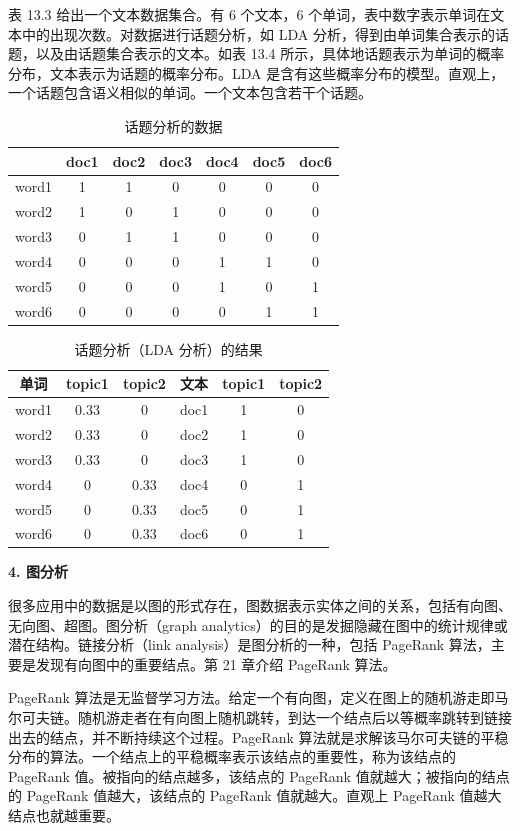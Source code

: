 \documentclass[UTF8,12pt,a4paper,fontset=fandol]{ctexart}
\begin{document}
表 13.3 给出一个文本数据集合。有 6 个文本，6 个单词，表中数字表示单词在文本中的出现次数。对数据进行话题分析，如 LDA 分析，得到由单词集合表示的话题，以及由话题集合表示的文本。如表 13.4 所示，具体地话题表示为单词的概率分布，文本表示为话题的概率分布。LDA 是含有这些概率分布的模型。直观上，一个话题包含语义相似的单词。一个文本包含若干个话题。

\begin{table}[htbp]
\centering
\caption{话题分析的数据}
\begin{tabular}{c|cccccc}
\toprule
 & doc1 & doc2 & doc3 & doc4 & doc5 & doc6\\
\midrule
word1 & 1 & 1 & 0 & 0 & 0 & 0\\
word2 & 1 & 0 & 1 & 0 & 0 & 0\\
word3 & 0 & 1 & 1 & 0 & 0 & 0\\
word4 & 0 & 0 & 0 & 1 & 1 & 0\\
word5 & 0 & 0 & 0 & 1 & 0 & 1\\
word6 & 0 & 0 & 0 & 0 & 1 & 1\\
\bottomrule
\end{tabular}
\end{table}

\begin{table}[htbp]
\centering
\caption{话题分析（LDA 分析）的结果}
\begin{tabular}{c|cc@{\qquad}c|cc}
\toprule
单词 & topic1 & topic2 & 文本 & topic1 & topic2\\
\midrule
word1 & 0.33 & 0 & doc1 & 1 & 0\\
word2 & 0.33 & 0 & doc2 & 1 & 0\\
word3 & 0.33 & 0 & doc3 & 1 & 0\\
word4 & 0 & 0.33 & doc4 & 0 & 1\\
word5 & 0 & 0.33 & doc5 & 0 & 1\\
word6 & 0 & 0.33 & doc6 & 0 & 1\\
\bottomrule
\end{tabular}
\end{table}

\noindent\textbf{4. 图分析}

很多应用中的数据是以图的形式存在，图数据表示实体之间的关系，包括有向图、无向图、超图。图分析（graph analytics）的目的是发掘隐藏在图中的统计规律或潜在结构。链接分析（link analysis）是图分析的一种，包括 PageRank 算法，主要是发现有向图中的重要结点。第 21 章介绍 PageRank 算法。

PageRank 算法是无监督学习方法。给定一个有向图，定义在图上的随机游走即马尔可夫链。随机游走者在有向图上随机跳转，到达一个结点后以等概率跳转到链接出去的结点，并不断持续这个过程。PageRank 算法就是求解该马尔可夫链的平稳分布的算法。一个结点上的平稳概率表示该结点的重要性，称为该结点的 PageRank 值。被指向的结点越多，该结点的 PageRank 值就越大；被指向的结点的 PageRank 值越大，该结点的 PageRank 值就越大。直观上 PageRank 值越大结点也就越重要。
\end{document}
